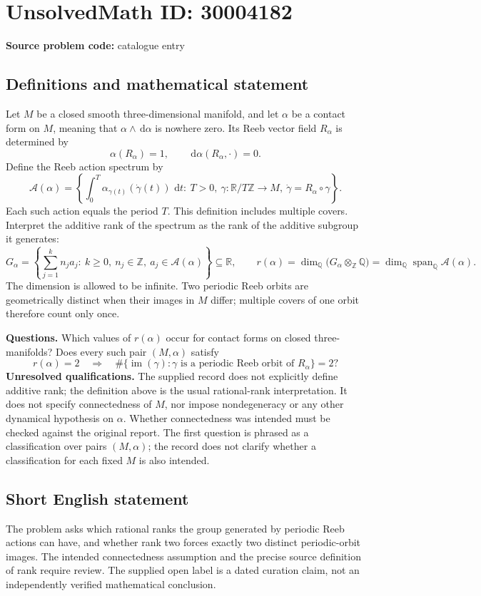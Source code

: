 \documentclass[11pt]{article}
\newcommand{\Z}{\mathbb{Z}}
\newcommand{\Q}{\mathbb{Q}}
\newcommand{\R}{\mathbb{R}}
\newcommand{\dd}{\,\mathrm{d}}
\begin{document}
\section*{UnsolvedMath ID: 30004182}
\textbf{Source problem code:} catalogue entry
\subsection{Definitions and mathematical statement}
Let \(M\) be a closed smooth three-dimensional manifold, and let \(\alpha\) be a contact form on \(M\), meaning that \(\alpha\wedge\dd\alpha\) is nowhere zero. Its Reeb vector field \(R_\alpha\) is determined by
\[
\alpha(R_\alpha)=1,\qquad \dd\alpha(R_\alpha,\cdot)=0.
\]
Define the Reeb action spectrum by
\[
\mathcal A(\alpha)=\left\{\int_0^T\alpha_{\gamma(t)}(\dot\gamma(t))\,\dd t:\ T>0,\ \gamma:\R/T\Z\longrightarrow M,\ \dot\gamma=R_\alpha\circ\gamma\right\}.
\]
Each such action equals the period \(T\). This definition includes multiple covers. Interpret the additive rank of the spectrum as the rank of the additive subgroup it generates:
\[
G_\alpha=\left\{\sum_{j=1}^k n_j a_j:\ k\geq 0,\ n_j\in\Z,\ a_j\in\mathcal A(\alpha)\right\}\subseteq\R,
\qquad
r(\alpha)=\dim_{\Q}\bigl(G_\alpha\otimes_{\Z}\Q\bigr)
=\dim_{\Q}\operatorname{span}_{\Q}\mathcal A(\alpha).
\]
The dimension is allowed to be infinite. Two periodic Reeb orbits are geometrically distinct when their images in \(M\) differ; multiple covers of one orbit therefore count only once.

\textbf{Questions.} Which values of \(r(\alpha)\) occur for contact forms on closed three-manifolds? Does every such pair \((M,\alpha)\) satisfy
\[
r(\alpha)=2\quad\Longrightarrow\quad
\#\{\operatorname{im}(\gamma):\gamma\text{ is a periodic Reeb orbit of }R_\alpha\}=2?
\]
\textbf{Unresolved qualifications.} The supplied record does not explicitly define additive rank; the definition above is the usual rational-rank interpretation. It does not specify connectedness of \(M\), nor impose nondegeneracy or any other dynamical hypothesis on \(\alpha\). Whether connectedness was intended must be checked against the original report. The first question is phrased as a classification over pairs \((M,\alpha)\); the record does not clarify whether a classification for each fixed \(M\) is also intended.
\subsection{Short English statement}
The problem asks which rational ranks the group generated by periodic Reeb actions can have, and whether rank two forces exactly two distinct periodic-orbit images. The intended connectedness assumption and the precise source definition of rank require review. The supplied open label is a dated curation claim, not an independently verified mathematical conclusion.
\end{document}
